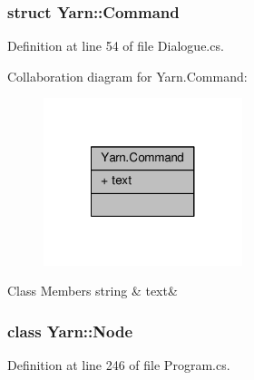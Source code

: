 \subsubsection{struct Yarn\-:\-:Command}


Definition at line 54 of file Dialogue.\-cs.



Collaboration diagram for Yarn.\-Command\-:
\nopagebreak
\begin{figure}[H]
\begin{center}
\leavevmode
\includegraphics[width=164pt]{a00380}
\end{center}
\end{figure}
\begin{DoxyFields}{Class Members}
\hypertarget{a00045_a8564e5104566e145f5d917ec846444d9}{string}\label{a00045_a8564e5104566e145f5d917ec846444d9}
&
text&
\\
\hline

\end{DoxyFields}
\label{a00367}
\hypertarget{a00045_a00367}{}
\subsubsection{class Yarn\-:\-:Node}


Definition at line 246 of file Program.\-cs.



